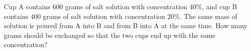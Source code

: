 Cup A contains $600$ grams of salt solution with concentration $40\%$, and cup B contains $400$ grams of salt solution with concentration $20\%$. The same mass of solution is poured from A into B and from B into A at the same time. How many grams should be exchanged so that the two cups end up with the same concentration?

